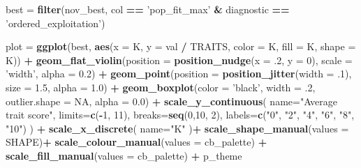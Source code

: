 \documentclass[]{book}
\newenvironment{Shaded}{\begin{snugshade}}{\end{snugshade}}
\newcommand{\DataTypeTok}[1]{\textcolor[rgb]{0.13,0.29,0.53}{#1}}
\newcommand{\DecValTok}[1]{\textcolor[rgb]{0.00,0.00,0.81}{#1}}
\newcommand{\FloatTok}[1]{\textcolor[rgb]{0.00,0.00,0.81}{#1}}
\newcommand{\KeywordTok}[1]{\textcolor[rgb]{0.13,0.29,0.53}{\textbf{#1}}}
\newcommand{\NormalTok}[1]{#1}
\newcommand{\OperatorTok}[1]{\textcolor[rgb]{0.81,0.36,0.00}{\textbf{#1}}}
\newcommand{\OtherTok}[1]{\textcolor[rgb]{0.56,0.35,0.01}{#1}}
\newcommand{\StringTok}[1]{\textcolor[rgb]{0.31,0.60,0.02}{#1}}
\begin{document}
\begin{Shaded}
\begin{Highlighting}[]
\NormalTok{best =}\StringTok{ }\KeywordTok{filter}\NormalTok{(nov_best, col }\OperatorTok{==}\StringTok{ 'pop_fit_max'} \OperatorTok{&}\StringTok{ }\NormalTok{diagnostic }\OperatorTok{==}\StringTok{ 'ordered_exploitation'}\NormalTok{)}

\NormalTok{plot =}\StringTok{ }\KeywordTok{ggplot}\NormalTok{(best, }\KeywordTok{aes}\NormalTok{(}\DataTypeTok{x =}\NormalTok{ K, }\DataTypeTok{y =}\NormalTok{ val }\OperatorTok{/}\StringTok{ }\NormalTok{TRAITS, }\DataTypeTok{color =}\NormalTok{ K, }\DataTypeTok{fill =}\NormalTok{ K, }\DataTypeTok{shape =}\NormalTok{ K)) }\OperatorTok{+}
\StringTok{  }\KeywordTok{geom_flat_violin}\NormalTok{(}\DataTypeTok{position =} \KeywordTok{position_nudge}\NormalTok{(}\DataTypeTok{x =} \FloatTok{.2}\NormalTok{, }\DataTypeTok{y =} \DecValTok{0}\NormalTok{), }\DataTypeTok{scale =} \StringTok{'width'}\NormalTok{, }\DataTypeTok{alpha =} \FloatTok{0.2}\NormalTok{) }\OperatorTok{+}
\StringTok{  }\KeywordTok{geom_point}\NormalTok{(}\DataTypeTok{position =} \KeywordTok{position_jitter}\NormalTok{(}\DataTypeTok{width =} \FloatTok{.1}\NormalTok{), }\DataTypeTok{size =} \FloatTok{1.5}\NormalTok{, }\DataTypeTok{alpha =} \FloatTok{1.0}\NormalTok{) }\OperatorTok{+}
\StringTok{  }\KeywordTok{geom_boxplot}\NormalTok{(}\DataTypeTok{color =} \StringTok{'black'}\NormalTok{, }\DataTypeTok{width =} \FloatTok{.2}\NormalTok{, }\DataTypeTok{outlier.shape =} \OtherTok{NA}\NormalTok{, }\DataTypeTok{alpha =} \FloatTok{0.0}\NormalTok{) }\OperatorTok{+}
\StringTok{  }\KeywordTok{scale_y_continuous}\NormalTok{(}
    \DataTypeTok{name=}\StringTok{"Average trait score"}\NormalTok{,}
    \DataTypeTok{limits=}\KeywordTok{c}\NormalTok{(}\OperatorTok{-}\DecValTok{1}\NormalTok{, }\DecValTok{11}\NormalTok{),}
    \DataTypeTok{breaks=}\KeywordTok{seq}\NormalTok{(}\DecValTok{0}\NormalTok{,}\DecValTok{10}\NormalTok{, }\DecValTok{2}\NormalTok{),}
    \DataTypeTok{labels=}\KeywordTok{c}\NormalTok{(}\StringTok{"0"}\NormalTok{, }\StringTok{"2"}\NormalTok{, }\StringTok{"4"}\NormalTok{, }\StringTok{"6"}\NormalTok{, }\StringTok{"8"}\NormalTok{, }\StringTok{"10"}\NormalTok{)}
\NormalTok{  ) }\OperatorTok{+}
\StringTok{  }\KeywordTok{scale_x_discrete}\NormalTok{(}
    \DataTypeTok{name=}\StringTok{"K"}
\NormalTok{  )}\OperatorTok{+}
\StringTok{  }\KeywordTok{scale_shape_manual}\NormalTok{(}\DataTypeTok{values =}\NormalTok{ SHAPE)}\OperatorTok{+}
\StringTok{  }\KeywordTok{scale_colour_manual}\NormalTok{(}\DataTypeTok{values =}\NormalTok{ cb_palette) }\OperatorTok{+}
\StringTok{  }\KeywordTok{scale_fill_manual}\NormalTok{(}\DataTypeTok{values =}\NormalTok{ cb_palette) }\OperatorTok{+}
\StringTok{  }\NormalTok{p_theme}


\end{Highlighting}
\end{Shaded}
\end{document}
